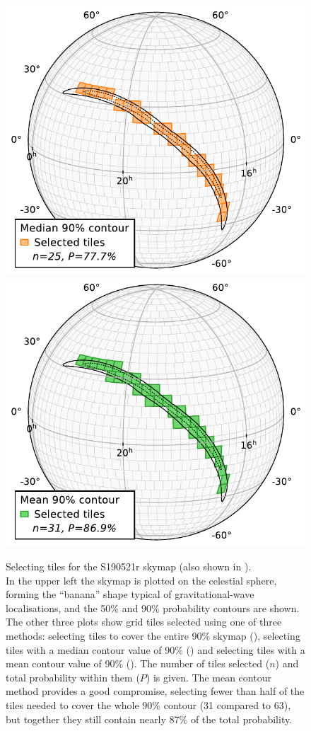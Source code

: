 \begin{colsection}
\begin{colsection}
\begin{figure}[p]
\begin{center}
        \vspace{0.5cm}

        \includegraphics[width=0.49\linewidth]{images/tiling/S190521r_3.pdf}
        \includegraphics[width=0.49\linewidth]{images/tiling/S190521r_4.pdf}
    \end{center}
    \caption[Selecting tiles for a gravitational-wave skymap]{
        Selecting tiles for the S190521r skymap (also shown in ).\\
        In the upper left the skymap is plotted on the celestial sphere, forming the ``banana'' shape typical of gravitational-wave localisations, and the 50\% and 90\% probability contours are shown.
        The other three plots show grid tiles selected using one of three methods: selecting tiles to cover the entire 90\% skymap (), selecting tiles with a median contour value of 90\% () and selecting tiles with a mean contour value of 90\% (). The number of tiles selected ($n$) and total probability within them ($P$) is given.
        The mean contour method provides a good compromise, selecting fewer than half of the tiles needed to cover the whole 90\% contour (31 compared to 63), but together they still contain nearly 87\% of the total probability.
    }\label{fig:selecting_tiles}
\end{figure}


\end{colsection}
\end{colsection}

